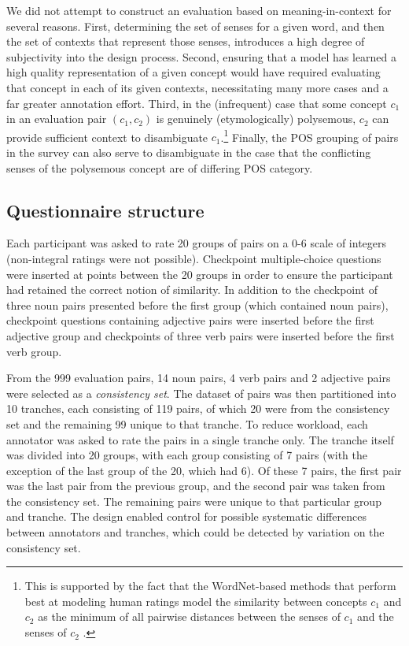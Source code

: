 \documentclass[fullname]{clv2}
\begin{document}
We did not attempt to construct an evaluation based on meaning-in-context for several reasons. First, determining the set of senses for a given word, and then the set of contexts that represent those senses, introduces a high degree of subjectivity into the design process. Second, ensuring that a model has learned a high quality representation of a given concept would have required evaluating that concept in each of its given contexts, necessitating many more cases and a far greater annotation effort. Third, in the (infrequent) case that some concept \(c_1\) in an evaluation pair \((c_1,c_2)\) is genuinely (etymologically) polysemous, \( c_2 \) can provide sufficient context to disambiguate \(c_1\).\footnote{This is supported by the fact that the WordNet-based methods that perform best at modeling human ratings  model the similarity between concepts \( c_1 \) and \( c_2 \) as the minimum of all pairwise distances between the senses of \(c_1\) and the senses of \(c_2\) \cite{resnik1995using,pedersen2004wordnet}.} Finally, the POS grouping of pairs in the survey can also serve to disambiguate in the case that the conflicting senses of the polysemous concept are of differing POS category.

\subsection{Questionnaire structure}

Each participant was asked to rate 20 groups of pairs on a 0-6 scale of integers (non-integral ratings were not possible). Checkpoint multiple-choice questions were inserted at points between the 20 groups in order to ensure the participant had retained the correct notion of similarity. In addition to the checkpoint of three noun pairs presented before the first group (which contained noun pairs), checkpoint questions containing adjective pairs were inserted before the first adjective group and checkpoints of three verb pairs were inserted before the first verb group.     

From the 999 evaluation pairs, 14 noun pairs, 4 verb pairs and 2 adjective pairs were selected as a \emph{consistency set}. The dataset of pairs was then partitioned into 10 tranches, each consisting of 119 pairs, of which 20 were from the consistency set and the remaining 99 unique to that tranche. To reduce workload, each annotator was asked to rate the pairs in a single tranche only. The tranche itself was divided into 20 groups, with each group consisting of 7 pairs (with the exception of the last group of the 20, which had 6). Of these 7 pairs, the first pair was the last pair from the previous group, and the second pair was taken from the consistency set. The remaining pairs were unique to that particular group and tranche. The design enabled control for possible systematic differences between annotators and tranches, which could be detected by variation on the consistency set. 
\end{document}
